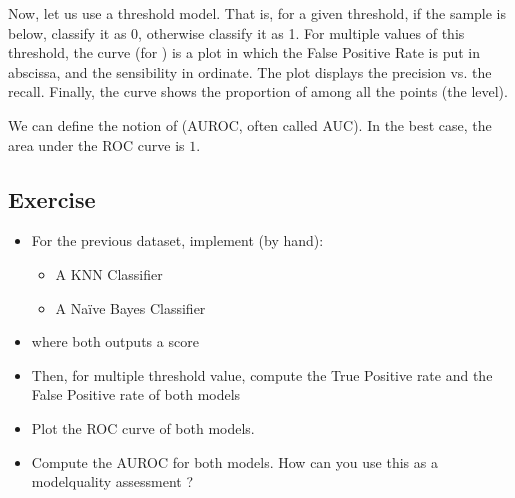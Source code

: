 \documentclass[letterpaper,10pt,english]{jupyterBook}
\begin{document}
\sphinxAtStartPar
Now, let us use a threshold model. That is, for a given threshold, if the sample is below, classify it as 0, otherwise classify it as 1. For multiple values of this threshold, the  curve (for ) is a plot in which the False Positive Rate is put in abscissa, and the sensibility in ordinate. The  plot displays the precision vs. the recall. Finally, the  curve shows the proportion of  among all the points (the  level).

\sphinxAtStartPar
We can define the notion of  (AUROC, often called AUC). In the best case, the area under the ROC curve is \(1\).


\subsection{Exercise}
\label{\detokenize{06:exercise}}\begin{itemize}
\item {} 
\sphinxAtStartPar
For the previous dataset, implement (by hand):
\begin{itemize}
\item {} 
\sphinxAtStartPar
A KNN Classifier

\item {} 
\sphinxAtStartPar
A Naïve Bayes Classifier

\end{itemize}

\item {} 
\sphinxAtStartPar
where both outputs a score

\item {} 
\sphinxAtStartPar
Then, for multiple threshold value, compute the True Positive rate and the False Positive rate of both models

\item {} 
\sphinxAtStartPar
Plot the ROC curve of both models.

\item {} 
\sphinxAtStartPar
Compute the AUROC for both models. How can you use this as a modelquality assessment ?

\end{itemize}
\end{document}
